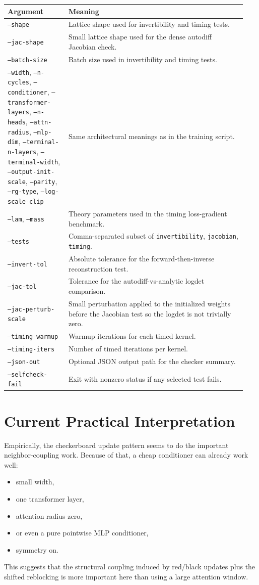 \documentclass[11pt]{article}
\begin{document}
\begin{longtable}{p{0.24\linewidth}p{0.70\linewidth}}
\toprule
Argument & Meaning \\
\midrule
\endhead
\texttt{--shape} & Lattice shape used for invertibility and timing tests. \\
\texttt{--jac-shape} & Small lattice shape used for the dense autodiff Jacobian check. \\
\texttt{--batch-size} & Batch size used in invertibility and timing tests. \\
\texttt{--width}, \texttt{--n-cycles}, \texttt{--conditioner}, \texttt{--transformer-layers}, \texttt{--n-heads}, \texttt{--attn-radius}, \texttt{--mlp-dim}, \texttt{--terminal-n-layers}, \texttt{--terminal-width}, \texttt{--output-init-scale}, \texttt{--parity}, \texttt{--rg-type}, \texttt{--log-scale-clip} & Same architectural meanings as in the training script. \\
\texttt{--lam}, \texttt{--mass} & Theory parameters used in the timing loss-gradient benchmark. \\
\texttt{--tests} & Comma-separated subset of \texttt{invertibility}, \texttt{jacobian}, \texttt{timing}. \\
\texttt{--invert-tol} & Absolute tolerance for the forward-then-inverse reconstruction test. \\
\texttt{--jac-tol} & Tolerance for the autodiff-vs-analytic logdet comparison. \\
\texttt{--jac-perturb-scale} & Small perturbation applied to the initialized weights before the Jacobian test so the logdet is not trivially zero. \\
\texttt{--timing-warmup} & Warmup iterations for each timed kernel. \\
\texttt{--timing-iters} & Number of timed iterations per kernel. \\
\texttt{--json-out} & Optional JSON output path for the checker summary. \\
\texttt{--selfcheck-fail} & Exit with nonzero status if any selected test fails. \\
\bottomrule
\end{longtable}

\section{Current Practical Interpretation}

Empirically, the checkerboard update pattern seems to do the important
neighbor-coupling work. Because of that, a cheap conditioner can already work
well:
\begin{itemize}
\item small width,
\item one transformer layer,
\item attention radius zero,
\item or even a pure pointwise MLP conditioner,
\item symmetry on.
\end{itemize}

This suggests that the structural coupling induced by red/black updates plus
the shifted reblocking is more important here than using a large attention
window.
\end{document}
